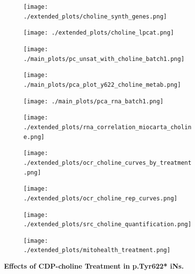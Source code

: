 \documentclass[12pt]{article}
\begin{document}
\begin{figure}[H]
\begin{subfigure}[t]{.3\textwidth}
    \end{subfigure}
    \begin{subfigure}[t]{0.25\textwidth}
        \caption{}
        \texttt{[image: ./extended\_plots/choline\_synth\_genes.png]}        
    \end{subfigure}
    \begin{subfigure}[t]{0.25\textwidth}
        \caption{}
        \texttt{[image: ./extended\_plots/choline\_lpcat.png]}        
    \end{subfigure}
    \begin{subfigure}[t]{.35\textwidth}
        \caption{}
        \texttt{[image: ./main\_plots/pc\_unsat\_with\_choline\_batch1.png]}        
    \end{subfigure} 
    \begin{subfigure}[t]{.25\textwidth}
        \caption{}
        \vspace{.3cm}
        \texttt{[image: ./main\_plots/pca\_plot\_y622\_choline\_metab.png]}        
    \end{subfigure} 
    \begin{subfigure}[t]{0.2\textwidth}
        \caption{}
        \texttt{[image: ./main\_plots/pca\_rna\_batch1.png]}        
    \end{subfigure}  
    \hspace{.25cm}
    \begin{subfigure}[t]{0.2\textwidth}
        \caption{}
        \texttt{[image: ./extended\_plots/rna\_correlation\_miocarta\_choline.png]}        
    \end{subfigure}
    \hspace{.25cm}
    \begin{subfigure}[t]{.25\textwidth}
        \caption{}
        \texttt{[image: ./extended\_plots/ocr\_choline\_curves\_by\_treatment.png]}        
    \end{subfigure}
    \begin{subfigure}[t]{.25\textwidth}
        \caption{}
        \texttt{[image: ./extended\_plots/ocr\_choline\_rep\_curves.png]}        
    \end{subfigure}
    \begin{subfigure}[t]{.22\textwidth}
        \caption{}
        \texttt{[image: ./extended\_plots/src\_choline\_quantification.png]}        
    \end{subfigure}
    \hspace{.25cm}
    \begin{subfigure}[t]{.45\textwidth}
        \caption{}
        \texttt{[image: ./extended\_plots/mitohealth\_treatment.png]}        
    \end{subfigure}
    \caption{
         \textbf{Effects of CDP-choline Treatment in p.Tyr622* iNs.}\\
     }
     \label{fig:choline_treatment}
\end{figure}
\end{document}

